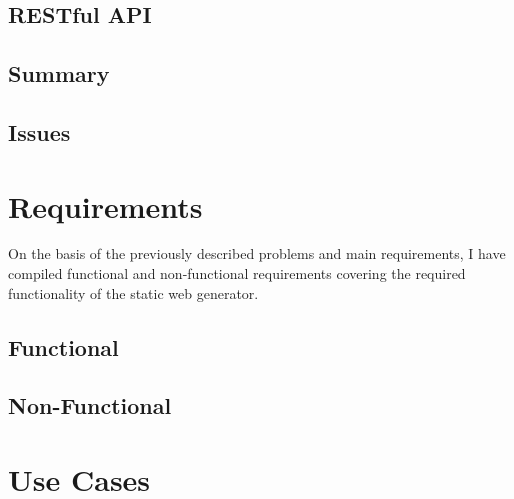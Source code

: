 \subsection{RESTful API}

\subsection{Summary}

\subsection{Issues}


\section{Requirements}
On the basis of the previously described problems and main requirements, I have compiled functional and non-functional requirements covering the required functionality of the static web generator.

\subsection{Functional}


\subsection{Non-Functional}



\section{Use Cases}


